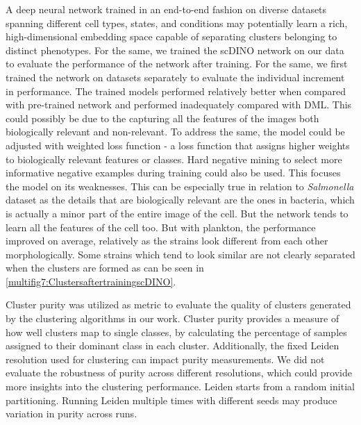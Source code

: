 \documentclass[12pt,a4paper]{article}
\begin{document}
A deep neural network trained in an end-to-end fashion on diverse datasets spanning different cell types, states, and conditions may potentially learn a rich, high-dimensional embedding space capable of separating clusters belonging to distinct phenotypes. For the same, we trained the scDINO network on our data to evaluate the performance of the network after training. For the same, we first trained the network on datasets separately to evaluate the individual increment in performance. The trained models performed relatively better when compared with pre-trained network and performed inadequately compared with DML. This could possibly be due to the capturing all the features of the images both biologically relevant and non-relevant. To address the same, the model could be adjusted with weighted loss function - a loss function that assigns higher weights to biologically relevant features or classes. Hard negative mining to select more informative negative examples during training could also be used. This focuses the model on its weaknesses. This can be especially true in relation to \textit{Salmonella} dataset as the details that are biologically relevant are the ones in bacteria, which is actually a minor part of the entire image of the cell. But the network tends to learn all the features of the cell too. But with plankton, the performance improved on average, relatively as the strains look different from each other morphologically. Some strains which tend to look similar are not clearly separated when the clusters are formed as can be seen in \ref{multifig7:ClustersaftertrainingscDINO}.

Cluster purity was utilized as metric to evaluate the quality of clusters generated by the clustering algorithms in our work. Cluster purity provides a measure of how well clusters map to single classes, by calculating the percentage of samples assigned to their dominant class in each cluster. Additionally, the fixed Leiden resolution used for clustering can impact purity measurements. We did not evaluate the robustness of purity across different resolutions, which could provide more insights into the clustering performance. Leiden starts from a random initial partitioning. Running Leiden multiple times with different seeds may produce variation in purity across runs.
\end{document}
